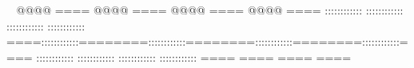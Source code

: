         @@@@    ====        @@@@    ====        @@@@    ====        @@@@    ====    ::::::::::::        ::::::::::::        ::::::::::::        ::::::::::::    ====::::::::::::========::::::::::::========::::::::::::========::::::::::::====    ::::::::::::        ::::::::::::        ::::::::::::        ::::::::::::    ====                ====                ====                ====                